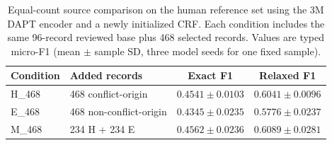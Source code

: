 \begin{table}[htbp]
\caption{Equal-count source comparison on the human reference set using the 3M DAPT encoder and a newly initialized CRF. Each condition includes the same 96-record reviewed base plus 468 selected records. Values are typed micro-F1 (mean $\pm$ sample SD, three model seeds for one fixed sample).}
\label{tab:hem-supplement}
\centering
\small
\begin{tabular}{@{}llcc@{}}
\toprule
Condition & Added records & Exact F1 & Relaxed F1 \\
\midrule
H\_468 & 468 conflict-origin & $0.4541\pm0.0103$ & $0.6041\pm0.0096$ \\
E\_468 & 468 non-conflict-origin & $0.4345\pm0.0235$ & $0.5776\pm0.0237$ \\
M\_468 & 234 H + 234 E & $0.4562\pm0.0236$ & $0.6089\pm0.0281$ \\
\bottomrule
\end{tabular}
\end{table}
